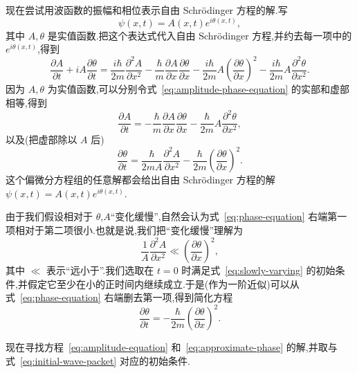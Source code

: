 现在尝试用波函数的振幅和相位表示自由 Schrödinger 方程的解.写
\[
\psi(x,t)=A(x,t)e^{i\theta(x,t)},
\]
其中 \(A,\theta\) 是实值函数.把这个表达式代入自由 Schrödinger 方程,并约去每一项中的 \(e^{i\theta(x,t)}\),得到
\begin{equation}
\frac{\partial A}{\partial t}
+iA\frac{\partial\theta}{\partial t}
=\frac{i\hbar}{2m}\frac{\partial^{2}A}{\partial x^{2}}
-\frac{\hbar}{m}\frac{\partial A}{\partial x}\frac{\partial\theta}{\partial x}
-\frac{i\hbar}{2m}A\left(\frac{\partial\theta}{\partial x}\right)^{2}
-\frac{i\hbar}{2m}A\frac{\partial^{2}\theta}{\partial x^{2}}.
\label{eq:amplitude-phase-equation}
\end{equation}
因为 \(A,\theta\) 为实值函数,可以分别令式~\eqref{eq:amplitude-phase-equation} 的实部和虚部相等,得到
\begin{equation}
\frac{\partial A}{\partial t}
=-\frac{\hbar}{m}\frac{\partial A}{\partial x}\frac{\partial\theta}{\partial x}
-\frac{\hbar}{2m}A\frac{\partial^{2}\theta}{\partial x^{2}},
\label{eq:amplitude-equation}
\end{equation}
以及(把虚部除以 \(A\) 后)
\begin{equation}
\frac{\partial\theta}{\partial t}
=\frac{\hbar}{2mA}\frac{\partial^{2}A}{\partial x^{2}}
-\frac{\hbar}{2m}\left(\frac{\partial\theta}{\partial x}\right)^{2}.
\label{eq:phase-equation}
\end{equation}
这个偏微分方程组的任意解都会给出自由 Schrödinger 方程的解 \(\psi(x,t)=A(x,t)e^{i\theta(x,t)}\).

由于我们假设相对于 \(\theta\),\(A\)“变化缓慢”,自然会认为式~\eqref{eq:phase-equation} 右端第一项相对于第二项很小.也就是说,我们把“变化缓慢”理解为
\begin{equation}
\frac{1}{A}\frac{\partial^{2}A}{\partial x^{2}}
\ll\left(\frac{\partial\theta}{\partial x}\right)^{2},
\label{eq:slowly-varying}
\end{equation}
其中 \(\ll\) 表示“远小于”.我们选取在 \(t=0\) 时满足式~\eqref{eq:slowly-varying} 的初始条件,并假定它至少在小的正时间内继续成立.于是(作为一阶近似)可以从式~\eqref{eq:phase-equation} 右端删去第一项,得到简化方程
\begin{equation}
\frac{\partial\theta}{\partial t}
=-\frac{\hbar}{2m}\left(\frac{\partial\theta}{\partial x}\right)^{2}.
\label{eq:approximate-phase}
\end{equation}

现在寻找方程~\eqref{eq:amplitude-equation} 和~\eqref{eq:approximate-phase} 的解,并取与式~\eqref{eq:initial-wave-packet} 对应的初始条件.

